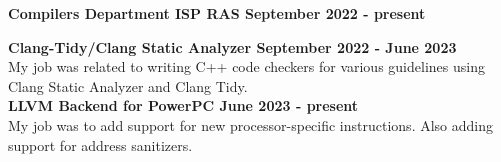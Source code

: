 \textbf{{Compilers Department ISP RAS} \hfill September 2022 - present}\par

\begin{itemize}
    \textbf{{Clang-Tidy/Clang Static Analyzer} \hfill September 2022 - June 2023} \\
  My job was related to writing C++ code checkers for various guidelines using Clang Static Analyzer and Clang Tidy. \\

    \textbf{{LLVM Backend for PowerPC} \hfill June 2023 - present}\\
    My job was to add support for new processor-specific instructions. Also adding support for address sanitizers.
  
\end{itemize}\par